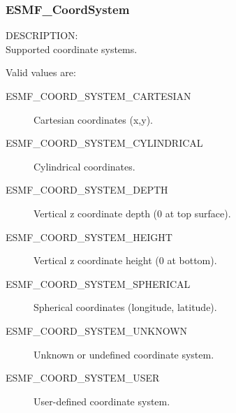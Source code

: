  \subsubsection{ESMF\_CoordSystem}

 {\sf DESCRIPTION:\\}
 Supported coordinate systems.

 Valid values are:
 \begin{description}
    \item [ESMF\_COORD\_SYSTEM\_CARTESIAN]
          Cartesian coordinates (x,y).

    \item [ESMF\_COORD\_SYSTEM\_CYLINDRICAL] 
          Cylindrical coordinates.

    \item [ESMF\_COORD\_SYSTEM\_DEPTH]
          Vertical z coordinate depth (0 at top surface).

    \item [ESMF\_COORD\_SYSTEM\_HEIGHT]
          Vertical z coordinate height (0 at bottom).

    \item [ESMF\_COORD\_SYSTEM\_SPHERICAL]
          Spherical coordinates (longitude, latitude).

    \item [ESMF\_COORD\_SYSTEM\_UNKNOWN]
          Unknown or undefined coordinate system.
    \item [ESMF\_COORD\_SYSTEM\_USER]
          User-defined coordinate system.

 \end{description}


